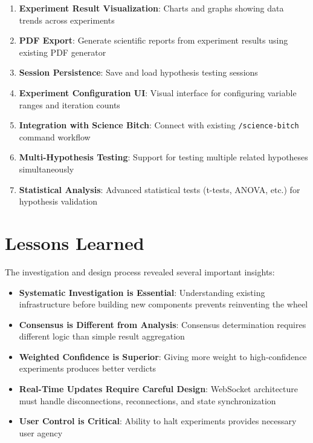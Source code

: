 \documentclass{book}
\begin{document}
\begin{enumerate}
    \item \textbf{Experiment Result Visualization}: Charts and graphs showing data trends across experiments
    \item \textbf{PDF Export}: Generate scientific reports from experiment results using existing PDF generator
    \item \textbf{Session Persistence}: Save and load hypothesis testing sessions
    \item \textbf{Experiment Configuration UI}: Visual interface for configuring variable ranges and iteration counts
    \item \textbf{Integration with Science Bitch}: Connect with existing \texttt{/science-bitch} command workflow
    \item \textbf{Multi-Hypothesis Testing}: Support for testing multiple related hypotheses simultaneously
    \item \textbf{Statistical Analysis}: Advanced statistical tests (t-tests, ANOVA, etc.) for hypothesis validation
\end{enumerate}

\section{Lessons Learned}

The investigation and design process revealed several important insights:

\begin{itemize}
    \item \textbf{Systematic Investigation is Essential}: Understanding existing infrastructure before building new components prevents reinventing the wheel
    \item \textbf{Consensus is Different from Analysis}: Consensus determination requires different logic than simple result aggregation
    \item \textbf{Weighted Confidence is Superior}: Giving more weight to high-confidence experiments produces better verdicts
    \item \textbf{Real-Time Updates Require Careful Design}: WebSocket architecture must handle disconnections, reconnections, and state synchronization
    \item \textbf{User Control is Critical}: Ability to halt experiments provides necessary user agency
\end{itemize}

\backmatter

\printindex
\end{document}
